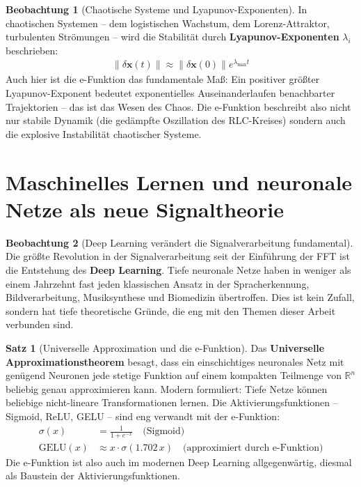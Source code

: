 ﻿\documentclass[a4paper,12pt]{report}
\theoremstyle{definition}
\newtheorem{satz}{Satz}
\newtheorem{beobachtung}{Beobachtung}
\begin{document}
	\begin{beobachtung}[Chaotische Systeme und Lyapunov-Exponenten]
		In chaotischen Systemen -- dem logistischen Wachstum, dem Lorenz-Attraktor, turbulenten Strömungen -- wird die Stabilität durch \textbf{Lyapunov-Exponenten} $\lambda_i$ beschrieben:
		\begin{align}
			\|\delta\mathbf{x}(t)\| \approx \|\delta\mathbf{x}(0)\| e^{\lambda_{\max} t}
		\end{align}
		Auch hier ist die e-Funktion das fundamentale Maß: Ein positiver größter Lyapunov-Exponent bedeutet exponentielles Auseinanderlaufen benachbarter Trajektorien -- das ist das Wesen des Chaos. Die e-Funktion beschreibt also nicht nur stabile Dynamik (die gedämpfte Oszillation des RLC-Kreises) sondern auch die explosive Instabilität chaotischer Systeme.
	\end{beobachtung}
	
	\section{Maschinelles Lernen und neuronale Netze als neue Signaltheorie}
	
	\begin{beobachtung}[Deep Learning verändert die Signalverarbeitung fundamental]
		Die größte Revolution in der Signalverarbeitung seit der Einführung der FFT ist die Entstehung des \textbf{Deep Learning}. Tiefe neuronale Netze haben in weniger als einem Jahrzehnt fast jeden klassischen Ansatz in der Spracherkennung, Bildverarbeitung, Musiksynthese und Biomedizin übertroffen. Dies ist kein Zufall, sondern hat tiefe theoretische Gründe, die eng mit den Themen dieser Arbeit verbunden sind.
	\end{beobachtung}
	
	\begin{satz}[Universelle Approximation und die e-Funktion]
		Das \textbf{Universelle Approximationstheorem} besagt, dass ein einschichtiges neuronales Netz mit genügend Neuronen jede stetige Funktion auf einem kompakten Teilmenge von $\mathbb{R}^n$ beliebig genau approximieren kann. Modern formuliert: Tiefe Netze können beliebige nicht-lineare Transformationen lernen. Die Aktivierungsfunktionen -- Sigmoid, ReLU, GELU -- sind eng verwandt mit der e-Funktion:
		\begin{align}
			\sigma(x) &= \frac{1}{1 + e^{-x}} \quad \text{(Sigmoid)} \\
			\text{GELU}(x) &\approx x \cdot \sigma(1.702\, x) \quad \text{(approximiert durch e-Funktion)}
		\end{align}
		Die e-Funktion ist also auch im modernen Deep Learning allgegenwärtig, diesmal als Baustein der Aktivierungsfunktionen.
	\end{satz}
	
\end{document}
